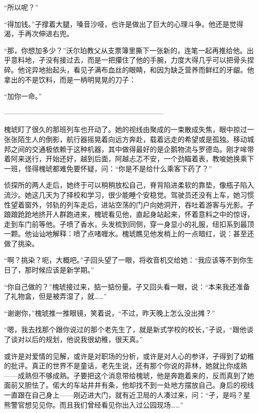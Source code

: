 \documentclass{article}
\begin{document}
\newpage 



“所以呢？”

“得加钱。”孑撑着大腿，嗓音沙哑，也许是做出了巨大的心理斗争。他还是觉得渴，手再次伸进右兜。

“那，你想加多少？”沃尔珀教父从支票簿里撕下一张新的，连笔一起再推给他。出乎意料地，孑没有接过去，而是一把攥住了他的手腕，力度大得几乎可以把骨头捏碎。他诧异地抬起头，看见孑满布血丝的眼睛，和因为缺乏营养而鲜红的牙龈。他拿出的不是饮料，而是一柄明晃晃的刀子：

“加你一命。”

———————————————————————

槐琥盯了很久的那班列车也开动了。她的视线由聚成的一束散成失焦，眼中掠过一张张陌生人的倒影，航行器摇晃着向远方奔赴，载着远走的希望或是孤独。移动城邦之间的交通极依赖于这种机器，其中做得最好的是企鹅物流与罗德岛。刚才哞带着阿来送行，开始还好，越到后面，阿越忐忑不安，一个劲瞄着表，教唆她换乘下一班，怪得槐琥都难免要怀疑，问：“你是不是给什么乘客下药了？”

\newpage 



侦探所的两人走后，她终于可以稍稍放松自己，脊背陷进柔软的靠垫，像瓶子陷入流沙。她这几天为了择校和学习，很少能睡个安稳觉。驾驶员还没有上车，她习惯性望着窗外，邻轨的列车走后，进站空荡的门户向她洞开，吞吐着游客与光影。孑踉踉跄跄地挤开人群跑进来，槐琥看见他，直起身站起来，怀着意料之中的惊讶，走到车门前等他。孑喷了香水，头发梳到同侧，穿一身显小的礼服，纽扣系到最顶一颗。他讪讪地解释：喷了点啫喱水。槐琥瞧见他发梢上的一点暗红，说：甚至还做了挑染。

“啊？挑染？呃，大概吧。”孑回头望了一眼，将收音机交给她：“我应该等不到你生日了，那时候应该是新学期。”

“你自己做的？”槐琥接过来，掂一掂份量。孑又回头看一眼，说：“本来我还准备了礼物盒，但是被弄湿了，就……”

“谢谢你，”槐琥推一推眼镜，笑着说，“不过，昨天晚上怎么没出摊？”

“嗯，我去找那个跟你说过的那个老先生了，就是新式学校的校长，”孑说，“跟他谈了谈对以后的规划，他说我很幼稚，很天真。”

\newpage 



或许是对爱情的见解，或许是对职场的分析，或许是对人心的参详，孑得到了幼稚的批评。真正的世界不是童话，老先生说，还有那个你说的菲林，她就比你成熟——成熟但不够成熟。孑要把这个消息带给槐琥，他是奔跑着来的，反而真到了她面前又胆怯了。偌大的车站井井有条，他却找不到一处地方摆放自己。身后的视线一直跟在自己身上——刚迈进大门，就有近卫局的人凑过来，问：“孑，是吗？星熊警官想见见你。而且我们曾经看见你出入过公园现场……”
\end{document}
